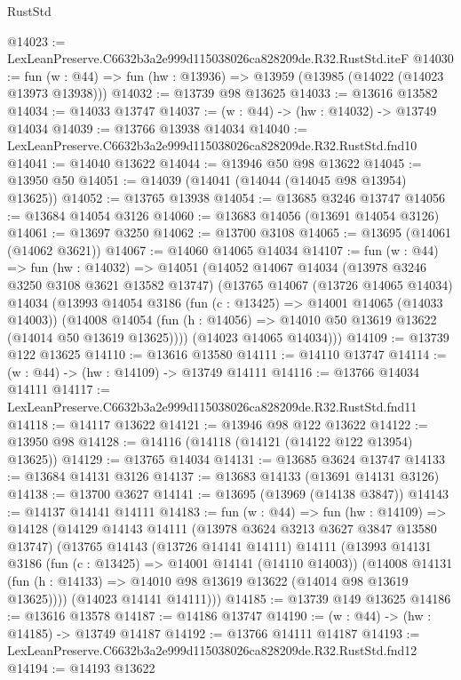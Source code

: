 \begin{lexlean}{RustStd}
\begin{coremodule}
@14023 := LexLeanPreserve.C6632b3a2e999d115038026ca828209de.R32.RustStd.iteF
@14030 := fun (w : @44) => fun (hw : @13936) => @13959 (@13985 (@14022 (@14023 @13973 @13938)))
@14032 := @13739 @98 @13625
@14033 := @13616 @13582
@14034 := @14033 @13747
@14037 := (w : @44) -> (hw : @14032) -> @13749 @14034
@14039 := @13766 @13938 @14034
@14040 := LexLeanPreserve.C6632b3a2e999d115038026ca828209de.R32.RustStd.fnd10
@14041 := @14040 @13622
@14044 := @13946 @50 @98 @13622
@14045 := @13950 @50
@14051 := @14039 (@14041 (@14044 (@14045 @98 @13954) @13625))
@14052 := @13765 @13938
@14054 := @13685 @3246 @13747
@14056 := @13684 @14054 @3126
@14060 := @13683 @14056 (@13691 @14054 @3126)
@14061 := @13697 @3250
@14062 := @13700 @3108
@14065 := @13695 (@14061 (@14062 @3621))
@14067 := @14060 @14065 @14034
@14107 := fun (w : @44) =>
  fun (hw : @14032) =>
  @14051
    (@14052
      @14067
      @14034
      (@13978 @3246 @3250 @3108 @3621 @13582 @13747)
      (@13765
        @14067
        (@13726 @14065 @14034)
        @14034
        (@13993
          @14054
          @3186
          (fun (c : @13425) => @14001 @14065 (@14033 @14003))
          (@14008 @14054 (fun (h : @14056) => @14010 @50 @13619 @13622 (@14014 @50 @13619 @13625))))
        (@14023 @14065 @14034)))
@14109 := @13739 @122 @13625
@14110 := @13616 @13580
@14111 := @14110 @13747
@14114 := (w : @44) -> (hw : @14109) -> @13749 @14111
@14116 := @13766 @14034 @14111
@14117 := LexLeanPreserve.C6632b3a2e999d115038026ca828209de.R32.RustStd.fnd11
@14118 := @14117 @13622
@14121 := @13946 @98 @122 @13622
@14122 := @13950 @98
@14128 := @14116 (@14118 (@14121 (@14122 @122 @13954) @13625))
@14129 := @13765 @14034
@14131 := @13685 @3624 @13747
@14133 := @13684 @14131 @3126
@14137 := @13683 @14133 (@13691 @14131 @3126)
@14138 := @13700 @3627
@14141 := @13695 (@13969 (@14138 @3847))
@14143 := @14137 @14141 @14111
@14183 := fun (w : @44) =>
  fun (hw : @14109) =>
  @14128
    (@14129
      @14143
      @14111
      (@13978 @3624 @3213 @3627 @3847 @13580 @13747)
      (@13765
        @14143
        (@13726 @14141 @14111)
        @14111
        (@13993
          @14131
          @3186
          (fun (c : @13425) => @14001 @14141 (@14110 @14003))
          (@14008 @14131 (fun (h : @14133) => @14010 @98 @13619 @13622 (@14014 @98 @13619 @13625))))
        (@14023 @14141 @14111)))
@14185 := @13739 @149 @13625
@14186 := @13616 @13578
@14187 := @14186 @13747
@14190 := (w : @44) -> (hw : @14185) -> @13749 @14187
@14192 := @13766 @14111 @14187
@14193 := LexLeanPreserve.C6632b3a2e999d115038026ca828209de.R32.RustStd.fnd12
@14194 := @14193 @13622

\end{coremodule}
\end{lexlean}
